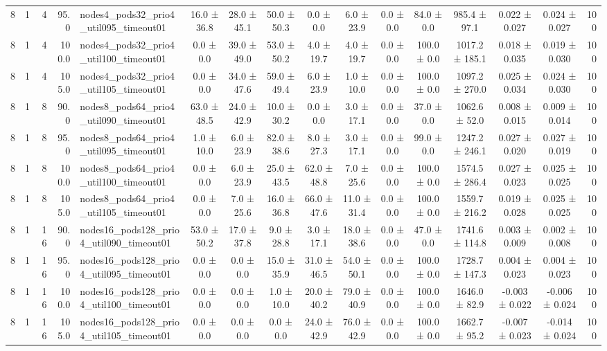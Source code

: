 \begin{tabular}{r r r r l c c c c c c c c c c r}
8 & 1 & 4 & 95.0 & nodes4\_pods32\_prio4\_util095\_timeout01 & 16.0 ± 36.8 & 28.0 ± 45.1 & 50.0 ± 50.3 & 0.0 ± 0.0 & 6.0 ± 23.9 & 0.0 ± 0.0 & 84.0 ± 0.0 & 985.4 ± 97.1 & 0.022 ± 0.027 & 0.024 ± 0.027 & 100 \\
8 & 1 & 4 & 100.0 & nodes4\_pods32\_prio4\_util100\_timeout01 & 0.0 ± 0.0 & 39.0 ± 49.0 & 53.0 ± 50.2 & 4.0 ± 19.7 & 4.0 ± 19.7 & 0.0 ± 0.0 & 100.0 ± 0.0 & 1017.2 ± 185.1 & 0.018 ± 0.035 & 0.019 ± 0.030 & 100 \\
8 & 1 & 4 & 105.0 & nodes4\_pods32\_prio4\_util105\_timeout01 & 0.0 ± 0.0 & 34.0 ± 47.6 & 59.0 ± 49.4 & 6.0 ± 23.9 & 1.0 ± 10.0 & 0.0 ± 0.0 & 100.0 ± 0.0 & 1097.2 ± 270.0 & 0.025 ± 0.034 & 0.024 ± 0.030 & 100 \\
8 & 1 & 8 & 90.0 & nodes8\_pods64\_prio4\_util090\_timeout01 & 63.0 ± 48.5 & 24.0 ± 42.9 & 10.0 ± 30.2 & 0.0 ± 0.0 & 3.0 ± 17.1 & 0.0 ± 0.0 & 37.0 ± 0.0 & 1062.6 ± 52.0 & 0.008 ± 0.015 & 0.009 ± 0.014 & 100 \\
8 & 1 & 8 & 95.0 & nodes8\_pods64\_prio4\_util095\_timeout01 & 1.0 ± 10.0 & 6.0 ± 23.9 & 82.0 ± 38.6 & 8.0 ± 27.3 & 3.0 ± 17.1 & 0.0 ± 0.0 & 99.0 ± 0.0 & 1247.2 ± 246.1 & 0.027 ± 0.020 & 0.027 ± 0.019 & 100 \\
8 & 1 & 8 & 100.0 & nodes8\_pods64\_prio4\_util100\_timeout01 & 0.0 ± 0.0 & 6.0 ± 23.9 & 25.0 ± 43.5 & 62.0 ± 48.8 & 7.0 ± 25.6 & 0.0 ± 0.0 & 100.0 ± 0.0 & 1574.5 ± 286.4 & 0.027 ± 0.023 & 0.025 ± 0.025 & 100 \\
8 & 1 & 8 & 105.0 & nodes8\_pods64\_prio4\_util105\_timeout01 & 0.0 ± 0.0 & 7.0 ± 25.6 & 16.0 ± 36.8 & 66.0 ± 47.6 & 11.0 ± 31.4 & 0.0 ± 0.0 & 100.0 ± 0.0 & 1559.7 ± 216.2 & 0.019 ± 0.028 & 0.025 ± 0.025 & 100 \\
8 & 1 & 16 & 90.0 & nodes16\_pods128\_prio4\_util090\_timeout01 & 53.0 ± 50.2 & 17.0 ± 37.8 & 9.0 ± 28.8 & 3.0 ± 17.1 & 18.0 ± 38.6 & 0.0 ± 0.0 & 47.0 ± 0.0 & 1741.6 ± 114.8 & 0.003 ± 0.009 & 0.002 ± 0.008 & 100 \\
8 & 1 & 16 & 95.0 & nodes16\_pods128\_prio4\_util095\_timeout01 & 0.0 ± 0.0 & 0.0 ± 0.0 & 15.0 ± 35.9 & 31.0 ± 46.5 & 54.0 ± 50.1 & 0.0 ± 0.0 & 100.0 ± 0.0 & 1728.7 ± 147.3 & 0.004 ± 0.023 & 0.004 ± 0.023 & 100 \\
8 & 1 & 16 & 100.0 & nodes16\_pods128\_prio4\_util100\_timeout01 & 0.0 ± 0.0 & 0.0 ± 0.0 & 1.0 ± 10.0 & 20.0 ± 40.2 & 79.0 ± 40.9 & 0.0 ± 0.0 & 100.0 ± 0.0 & 1646.0 ± 82.9 & -0.003 ± 0.022 & -0.006 ± 0.024 & 100 \\
8 & 1 & 16 & 105.0 & nodes16\_pods128\_prio4\_util105\_timeout01 & 0.0 ± 0.0 & 0.0 ± 0.0 & 0.0 ± 0.0 & 24.0 ± 42.9 & 76.0 ± 42.9 & 0.0 ± 0.0 & 100.0 ± 0.0 & 1662.7 ± 95.2 & -0.007 ± 0.023 & -0.014 ± 0.024 & 100 \\

\end{tabular}
